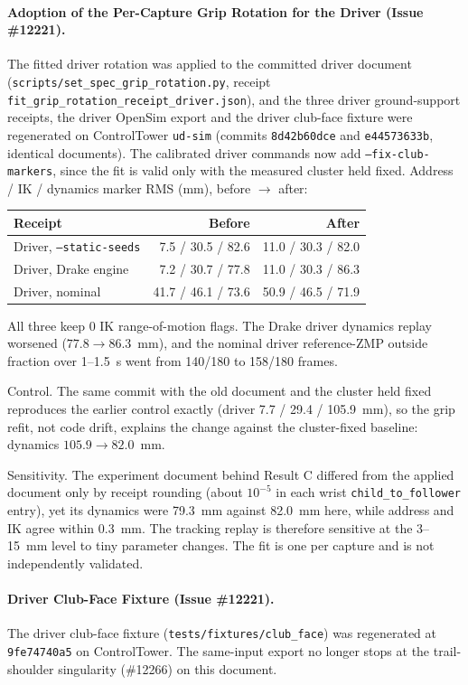 \documentclass[11pt,a4paper]{article}
\begin{document}
\paragraph{Adoption of the Per-Capture Grip Rotation for the Driver (Issue \#12221).}
The fitted driver rotation was applied to the committed driver document
(\texttt{scripts/set\_spec\_grip\_rotation.py}, receipt
\texttt{fit\_grip\_rotation\_receipt\_driver.json}), and the three driver
ground-support receipts, the driver OpenSim export and the driver club-face fixture
were regenerated on ControlTower \texttt{ud-sim} (commits \texttt{8d42b60dce} and
\texttt{e44573633b}, identical documents). The calibrated driver commands now add
\texttt{--fix-club-markers}, since the fit is valid only with the measured cluster
held fixed. Address / IK / dynamics marker RMS (mm), before $\to$ after:

\begin{center}
\begin{tabular}{lrr}
\hline
Receipt & Before & After \\
\hline
Driver, \texttt{--static-seeds} & 7.5 / 30.5 / 82.6 & 11.0 / 30.3 / 82.0 \\
Driver, Drake engine & 7.2 / 30.7 / 77.8 & 11.0 / 30.3 / 86.3 \\
Driver, nominal & 41.7 / 46.1 / 73.6 & 50.9 / 46.5 / 71.9 \\
\hline
\end{tabular}
\end{center}
All three keep 0 IK range-of-motion flags. The Drake driver dynamics replay worsened
($77.8 \to 86.3$~mm), and the nominal driver reference-ZMP outside fraction over
1--1.5~s went from 140/180 to 158/180 frames.

Control. The same commit with the old document and the cluster held fixed
reproduces the earlier control exactly (driver 7.7 / 29.4 / 105.9~mm), so the grip
refit, not code drift, explains the change against the cluster-fixed baseline:
dynamics $105.9 \to 82.0$~mm.

Sensitivity. The experiment document behind Result C differed from the applied
document only by receipt rounding (about $10^{-5}$ in each wrist
\texttt{child\_to\_follower} entry), yet its dynamics were 79.3~mm against 82.0~mm
here, while address and IK agree within 0.3~mm. The tracking replay is therefore
sensitive at the 3--15~mm level to tiny parameter changes. The fit is one per
capture and is not independently validated.

\paragraph{Driver Club-Face Fixture (Issue \#12221).}
The driver club-face fixture (\texttt{tests/fixtures/club\_face}) was regenerated at
\texttt{9fe74740a5} on ControlTower. The same-input export no longer stops at the
trail-shoulder singularity (\#12266) on this document.
\end{document}
